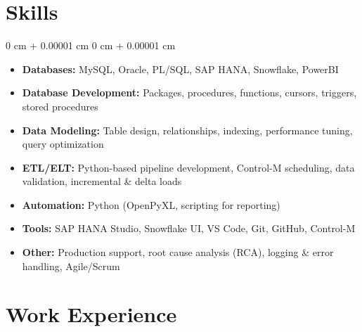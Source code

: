 \documentclass[10pt, letterpaper]{article}
\newenvironment{highlightsforbulletentries}{
    \begin{itemize}[
        topsep=0.10 cm,
        parsep=0.10 cm,
        partopsep=0pt,
        itemsep=0pt,
        leftmargin=10pt
    ]
}{
    \end{itemize}
} %
\newenvironment{onecolentry}{
    \begin{adjustwidth}{
        0 cm + 0.00001 cm
    }{
        0 cm + 0.00001 cm
    }
}{
    \end{adjustwidth}
} %
\begin{document}
    
     \section{Skills}

    \begin{onecolentry}
        \begin{highlightsforbulletentries}


\item \textbf{Databases:} MySQL, Oracle, PL/SQL, SAP HANA, Snowflake, PowerBI
\item \textbf{Database Development:} Packages, procedures, functions, cursors, triggers, stored procedures
\item \textbf{Data Modeling:} Table design, relationships, indexing, performance tuning, query optimization
\item \textbf{ETL/ELT:} Python-based pipeline development, Control-M scheduling, data validation, incremental \& delta loads
\item \textbf{Automation:} Python (OpenPyXL, scripting for reporting)
\item \textbf{Tools:} SAP HANA Studio, Snowflake UI, VS Code, Git, GitHub, Control-M
\item \textbf{Other:} Production support, root cause analysis (RCA), logging \& error handling, Agile/Scrum


        \end{highlightsforbulletentries}
    \end{onecolentry}

    \section{Work Experience}
\end{document}
